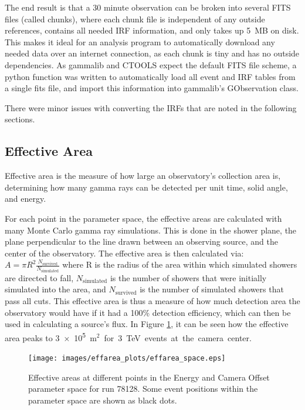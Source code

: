   The end result is that a 30 minute observation can be broken into several FITS files (called chunks), where each chunk file is independent of any outside references, contains all needed IRF information, and only takes up \nicetilde\SI{5}{MB} on disk.
  This makes it ideal for an analysis program to automatically download any needed data over an internet connection, as each chunk is tiny and has no outside dependencies.
  As gammalib and CTOOLS expect the default FITS file scheme, a python function was written to automatically load all event and IRF tables from a single fits file, and import this information into gammalib's GObservation class.

  There were minor issues with converting the IRFs that are noted in the following sections.


  \subsection{Effective Area}\label{subsec:effarea}
    Effective area is the measure of how large an observatory's collection area is, determining how many gamma rays can be detected per unit time, solid angle, and energy.

    For each point in the parameter space, the effective areas are calculated with many Monte Carlo gamma ray simulations.
    This is done in the shower plane, the plane perpendicular to the line drawn between an observing source, and the center of the observatory.
    The effective area is then calculated via:
    $A=\pi R^2 \frac{N_{\text{survived}}}{N_{\text{simulated}}}$
    where R is the radius of the area within which simulated showers are directed to fall, $N_{\text{simulated}}$ is the number of showers that were initially simulated into the area, and $N_{\text{survived}}$ is the number of simulated showers that pass all cuts.
    This effective area is thus a measure of how much detection area the observatory would have if it had a 100\% detection efficiency, which can then be used in calculating a source's flux.
    In Figure \ref{fig:effarea_paramspace}, it can be seen how the effective area peaks to \nicetilde{}\SI{3e5}{m${}^2$} for \SI{3}{\TeV} events at the camera center.

    \begin{figure}[ht]
      \centering
      \texttt{[image: images/effarea\_plots/effarea\_space.eps]}
      \caption[Effective Area Parameter Space]{
        Effective areas at different points in the Energy and Camera Offset parameter space for run 78128.
        Some event positions within the parameter space are shown as black dots.
      }
      \label{fig:effarea_paramspace}
    \end{figure}

